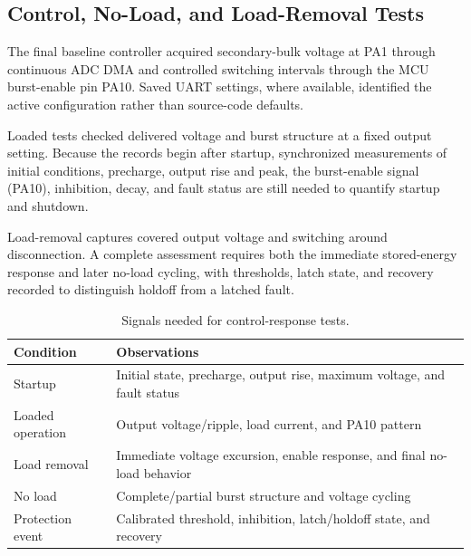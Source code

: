 \subsection{Control, No-Load, and Load-Removal Tests}
\label{sec:method-control}

The final baseline controller acquired secondary-bulk voltage at PA1 through
continuous ADC DMA and controlled switching intervals through the MCU burst-enable
pin PA10. Saved UART settings, where available, identified the active
configuration rather than source-code defaults.

Loaded tests checked delivered voltage and burst structure at a fixed output setting. Because the records begin after startup, synchronized measurements of initial conditions, precharge, output rise and peak, the burst-enable signal (PA10), inhibition, decay, and fault status are still needed to quantify startup and shutdown.

Load-removal captures covered output voltage and switching around disconnection.
A complete assessment requires both the immediate stored-energy response and
later no-load cycling, with thresholds, latch state, and recovery recorded to
distinguish holdoff from a latched fault.

\begin{table}[htbp]
\centering
\caption{Signals needed for control-response tests.}
\label{tab:control-tests}
\begin{tabularx}{\textwidth}{@{}p{}X@{}}
\toprule
Condition & Observations\\
\midrule
Startup & Initial state, precharge, output rise, maximum voltage, and fault status\\
Loaded operation & Output voltage/ripple, load current, and PA10 pattern\\
Load removal & Immediate voltage excursion, enable response, and final no-load behavior\\
No load & Complete/partial burst structure and voltage cycling\\
Protection event & Calibrated threshold, inhibition, latch/holdoff state, and recovery\\
\bottomrule
\end{tabularx}
\end{table}
